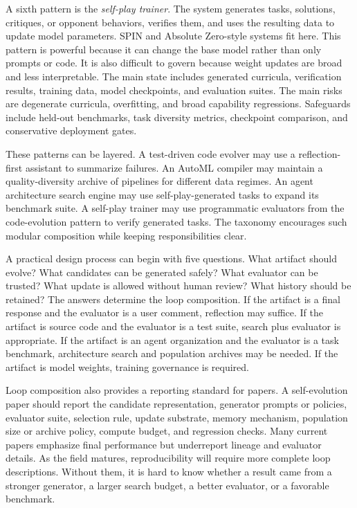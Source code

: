 A sixth pattern is the \emph{self-play trainer}.  The system generates tasks, solutions, critiques, or opponent behaviors, verifies them, and uses the resulting data to update model parameters.  SPIN and Absolute Zero-style systems fit here.  This pattern is powerful because it can change the base model rather than only prompts or code.  It is also difficult to govern because weight updates are broad and less interpretable.  The main state includes generated curricula, verification results, training data, model checkpoints, and evaluation suites.  The main risks are degenerate curricula, overfitting, and broad capability regressions.  Safeguards include held-out benchmarks, task diversity metrics, checkpoint comparison, and conservative deployment gates.

These patterns can be layered.  A test-driven code evolver may use a reflection-first assistant to summarize failures.  An AutoML compiler may maintain a quality-diversity archive of pipelines for different data regimes.  An agent architecture search engine may use self-play-generated tasks to expand its benchmark suite.  A self-play trainer may use programmatic evaluators from the code-evolution pattern to verify generated tasks.  The taxonomy encourages such modular composition while keeping responsibilities clear.

A practical design process can begin with five questions.  What artifact should evolve?  What candidates can be generated safely?  What evaluator can be trusted?  What update is allowed without human review?  What history should be retained?  The answers determine the loop composition.  If the artifact is a final response and the evaluator is a user comment, reflection may suffice.  If the artifact is source code and the evaluator is a test suite, search plus evaluator is appropriate.  If the artifact is an agent organization and the evaluator is a task benchmark, architecture search and population archives may be needed.  If the artifact is model weights, training governance is required.

Loop composition also provides a reporting standard for papers.  A self-evolution paper should report the candidate representation, generator prompts or policies, evaluator suite, selection rule, update substrate, memory mechanism, population size or archive policy, compute budget, and regression checks.  Many current papers emphasize final performance but underreport lineage and evaluator details.  As the field matures, reproducibility will require more complete loop descriptions.  Without them, it is hard to know whether a result came from a stronger generator, a larger search budget, a better evaluator, or a favorable benchmark.

